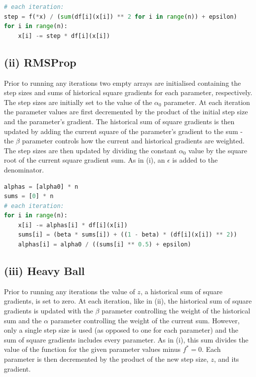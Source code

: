 \documentclass[12pt]{article}
\begin{document}
\lstset{basicstyle=\footnotesize}
\begin{lstlisting}[language=Python]
# each iteration:
step = f(*x) / (sum(df[i](x[i]) ** 2 for i in range(n)) + epsilon)
for i in range(n):
    x[i] -= step * df[i](x[i])
\end{lstlisting}

\subsection*{(ii) RMSProp}

Prior to running any iterations two empty arrays are initialised containing the step sizes and sums of historical square gradients for each parameter, respectively. The step sizes are initially set to the value of the $\alpha_0$ parameter. At each iteration the parameter values are first decremented by the product of the initial step size and the parameter's gradient. The historical sum of square gradients is then updated by adding the current square of the parameter's gradient to the sum - the $\beta$ parameter controls how the current and historical gradients are weighted. The step sizes are then updated by dividing the constant $\alpha_0$ value by the square root of the current square gradient sum. As in (i), an $\epsilon$ is added to the denominator.

\lstset{basicstyle=\footnotesize}
\begin{lstlisting}[language=Python]
alphas = [alpha0] * n
sums = [0] * n
# each iteration:
for i in range(n):
    x[i] -= alphas[i] * df[i](x[i])
    sums[i] = (beta * sums[i]) + ((1 - beta) * (df[i](x[i]) ** 2))
    alphas[i] = alpha0 / ((sums[i] ** 0.5) + epsilon)
\end{lstlisting}

\subsection*{(iii) Heavy Ball}

Prior to running any iterations the value of $z$, a historical sum of square gradients, is set to zero. At each iteration, like in (ii), the historical sum of square gradients is updated with the $\beta$ parameter controlling the weight of the historical sum and the $\alpha$ parameter controlling the weight of the current sum. However, only a single step size is used (as opposed to one for each parameter) and the sum of square gradients includes every parameter. As in (i), this sum divides the value of the function for the given parameter values minus $f^*=0$. Each parameter is then decremented by the product of the new step size, $z$, and its gradient.
\end{document}
